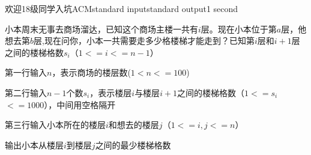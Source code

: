\begin{problem}{欢迎18级同学入坑ACM}{standard input}{standard output}{1 second}

小本周末无事去商场溜达，已知这个商场主楼一共有$i$层。现在小本位于第$a$层，他想去第$b$层,现在问你，小本一共需要走多少格楼梯才能走到？已知第$i$层和$i+1$层之间的楼梯格数$s_i$（$1<=i<=n-1$）

\InputFile

第一行输入$n$，表示商场的楼层数($1<n<=100$)

第二行输入$n-1$个数$s_i$，表示楼层$i$与楼层$i+1$之间的楼梯格数（$1<=$$s_i$$<=1000$），中间用空格隔开

第三行输入小本所在的楼层$i$和想去的楼层$j$（$1<=i,j<=n$）

\OutputFile

输出小本从楼层$i$到楼层$j$之间的最少楼梯格数

\Examples

\begin{example}
%
%
\end{example}
\end{problem}

